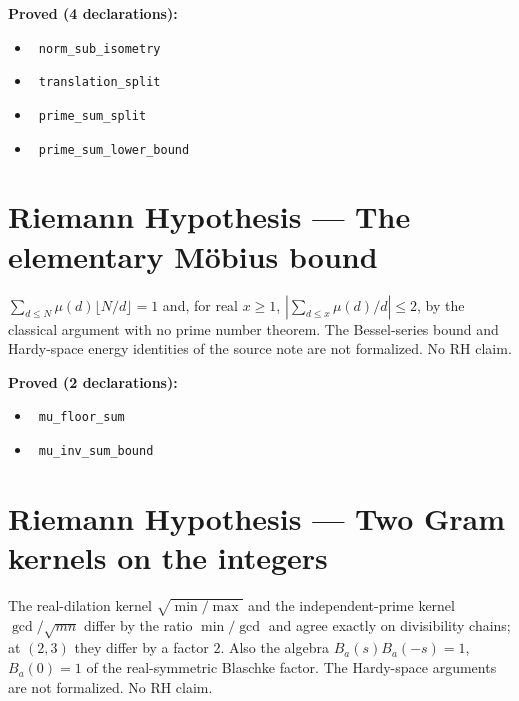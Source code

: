 \documentclass{report}
\theoremstyle{definition}
\begin{document}
\noindent\textbf{Proved (4 declarations):}
\begin{itemize}
  \item {}\leanok\ \texttt{norm\_sub\_isometry}
  \item {}\leanok\ \texttt{translation\_split}
  \item {}\leanok\ \texttt{prime\_sum\_split}
  \item {}\leanok\ \texttt{prime\_sum\_lower\_bound}
\end{itemize}

\section{Riemann Hypothesis --- The elementary M\"obius bound}
$\sum_{d\le N}\mu(d)\lfloor N/d\rfloor=1$ and, for real $x\ge1$, $|\sum_{d\le x}\mu(d)/d|\le2$, by the classical argument with no prime number theorem. The Bessel-series bound and Hardy-space energy identities of the source note are not formalized. No RH claim.

\noindent\textbf{Proved (2 declarations):}
\begin{itemize}
  \item {}\leanok\ \texttt{mu\_floor\_sum}
  \item {}\leanok\ \texttt{mu\_inv\_sum\_bound}
\end{itemize}

\section{Riemann Hypothesis --- Two Gram kernels on the integers}
The real-dilation kernel $\sqrt{\min/\max}$ and the independent-prime kernel $\gcd/\sqrt{mn}$ differ by the ratio $\min/\gcd$ and agree exactly on divisibility chains; at $(2,3)$ they differ by a factor $2$. Also the algebra $B_a(s)B_a(-s)=1$, $B_a(0)=1$ of the real-symmetric Blaschke factor. The Hardy-space arguments are not formalized. No RH claim.
\end{document}
